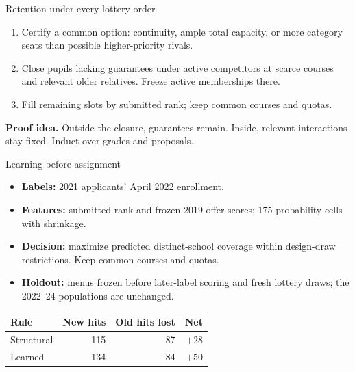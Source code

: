 \begin{frame}{Retention under every lottery order}
\small
\begin{enumerate}
  \item Certify a common option: continuity, ample total capacity,
  or more category seats than possible higher-priority rivals.
  \item Close pupils lacking guarantees under active competitors at scarce
  courses and relevant older relatives. Freeze active memberships there.
  \item Fill remaining slots by submitted rank; keep common courses and quotas.
\end{enumerate}
\medskip
\textbf{Proof idea.} Outside the closure, guarantees remain.
Inside, relevant interactions stay fixed. Induct over grades and proposals.
\end{frame}

\begin{frame}{Learning before assignment}
\small
\begin{itemize}
  \item \textbf{Labels:} 2021 applicants' April 2022 enrollment.
  \item \textbf{Features:} submitted rank and frozen 2019 offer scores;
  175 probability cells with shrinkage.
  \item \textbf{Decision:} maximize predicted distinct-school coverage within
  design-draw restrictions. Keep common courses and quotas.
  \item \textbf{Holdout:} menus frozen before later-label scoring and fresh
  lottery draws; the 2022--24 populations are unchanged.
\end{itemize}
\begin{center}
\setlength{\tabcolsep}{10pt}
\begin{tabular}{lrrr}
\hline
Rule & New hits & Old hits lost & Net\\
\hline
Structural & 115 & 87 & $+28$\\
Learned & 134 & 84 & $+50$\\
\hline
\end{tabular}
\end{center}
\end{frame}

